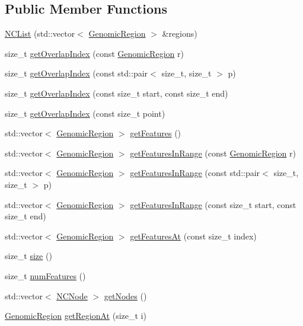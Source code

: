 \subsection*{Public Member Functions}
\begin{DoxyCompactItemize}
\item 
\hyperlink{classNCList_ab6c2b7decd70fcde7b54db4e79b64b85}{N\+C\+List} (std\+::vector$<$ \hyperlink{classGenomicRegion}{Genomic\+Region} $>$ \&regions)
\item 
size\+\_\+t \hyperlink{classNCList_a98e796a8e78efec9d019fb4303d4c8f3}{get\+Overlap\+Index} (const \hyperlink{classGenomicRegion}{Genomic\+Region} r)
\item 
size\+\_\+t \hyperlink{classNCList_a3199031fe2904e2cac57a682e07573c5}{get\+Overlap\+Index} (const std\+::pair$<$ size\+\_\+t, size\+\_\+t $>$ p)
\item 
size\+\_\+t \hyperlink{classNCList_a01ce26e143d1edf32caf50d472c1cce3}{get\+Overlap\+Index} (const size\+\_\+t start, const size\+\_\+t end)
\item 
size\+\_\+t \hyperlink{classNCList_a226ca89f140feac5088af4be366bcd58}{get\+Overlap\+Index} (const size\+\_\+t point)
\item 
std\+::vector$<$ \hyperlink{classGenomicRegion}{Genomic\+Region} $>$ \hyperlink{classNCList_af67a0c748ed4e7d095bb6092c1f291fb}{get\+Features} ()
\item 
std\+::vector$<$ \hyperlink{classGenomicRegion}{Genomic\+Region} $>$ \hyperlink{classNCList_acaec79f5de348b5645a856fcde6d58cf}{get\+Features\+In\+Range} (const \hyperlink{classGenomicRegion}{Genomic\+Region} r)
\item 
std\+::vector$<$ \hyperlink{classGenomicRegion}{Genomic\+Region} $>$ \hyperlink{classNCList_aab695768230d12b179699ca8f19f5d4c}{get\+Features\+In\+Range} (const std\+::pair$<$ size\+\_\+t, size\+\_\+t $>$ p)
\item 
std\+::vector$<$ \hyperlink{classGenomicRegion}{Genomic\+Region} $>$ \hyperlink{classNCList_a02b767b23f0007af67174cb2c2e6d92b}{get\+Features\+In\+Range} (const size\+\_\+t start, const size\+\_\+t end)
\item 
std\+::vector$<$ \hyperlink{classGenomicRegion}{Genomic\+Region} $>$ \hyperlink{classNCList_a6de14b47eb6b5c7291f5469609d500f6}{get\+Features\+At} (const size\+\_\+t index)
\item 
size\+\_\+t \hyperlink{classNCList_a4bb83c717bfa1b169f48809a4ed32f2e}{size} ()
\item 
size\+\_\+t \hyperlink{classNCList_a88ba10ba7017497f6912e8f3570239e9}{num\+Features} ()
\item 
std\+::vector$<$ \hyperlink{classNCList_1_1NCNode}{N\+C\+Node} $>$ \hyperlink{classNCList_a4ea0b59d58fcd385adb2fa4e92aae35b}{get\+Nodes} ()
\item 
\hyperlink{classGenomicRegion}{Genomic\+Region} \hyperlink{classNCList_a002aee45aea558b91957c4f282b83565}{get\+Region\+At} (size\+\_\+t i)
\end{DoxyCompactItemize}
